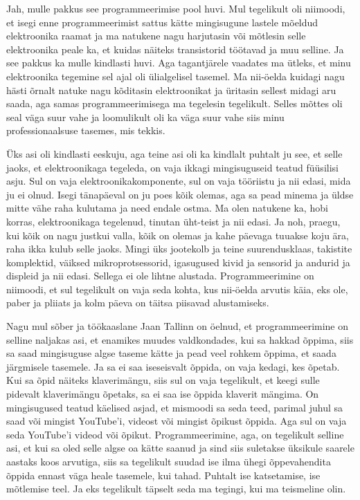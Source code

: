 
Jah, mulle pakkus see programmeerimise pool huvi. Mul tegelikult oli niimoodi, 
et isegi enne programmeerimist sattus kätte mingisugune lastele mõeldud 
elektroonika raamat ja ma  natukene nagu harjutasin või mõtlesin selle 
elektroonika peale ka, et kuidas näiteks transistorid töötavad ja muu selline. 
Ja see pakkus ka mulle kindlasti huvi. Aga tagantjärele vaadates  ma 
ütleks, et minu elektroonika tegemine sel ajal oli  ülialgelisel tasemel. Ma 
nii-öelda  kuidagi nagu hästi õrnalt natuke nagu kõditasin elektroonikat ja 
üritasin sellest midagi aru saada, aga samas programmeerimisega ma tegelesin  
tegelikult. Selles mõttes oli seal väga suur vahe ja loomulikult oli ka väga 
suur vahe siis minu  professionaalsuse tasemes, mis  tekkis.


Üks asi oli kindlasti eeskuju, aga teine asi oli ka kindlalt puhtalt ju see, et 
selle jaoks, et elektroonikaga tegeleda,  on vaja ikkagi mingisuguseid 
teatud füüsilisi asju. Sul on vaja elektroonikakomponente, sul on vaja 
tööriistu ja nii edasi, mida ju ei olnud. Isegi tänapäeval on ju poes  kõik 
olemas, aga sa pead minema ja üldse mitte vähe raha kulutama ja need 
endale ostma. Ma olen natukene ka, hobi korras, elektroonikaga tegelenud, 
tinutan üht-teist ja nii edasi. Ja noh, praegu, kui kõik on nagu 
justkui valla, kõik on olemas ja kahe päevaga tuuakse koju ära, raha ikka kulub 
selle jaoks. Mingi  üks jootekolb ja teine suurendusklaas, takistite 
komplektid, väiksed mikroprotsessorid, igasugused kivid ja sensorid ja andurid 
ja displeid ja nii edasi. Sellega ei ole lihtne alustada. Programmeerimine on 
niimoodi, et sul tegelikult on vaja seda kohta, kus nii-öelda arvutis käia, eks 
ole, paber ja pliiats ja kolm päeva on täitsa piisavad alustamiseks.

Nagu mul sõber ja töökaaslane Jaan Tallinn on  
öelnud, et programmeerimine on selline naljakas asi, et  enamikes muudes  
valdkondades, kui sa hakkad   õppima, siis sa saad mingisuguse 
algse  taseme kätte ja  pead veel rohkem õppima, et saada järgmisele 
tasemele. Ja sa ei saa iseseisvalt õppida,  
on vaja kedagi, kes õpetab. Kui sa õpid näiteks klaverimängu, siis sul on 
vaja tegelikult, et keegi sulle pidevalt klaverimängu õpetaks, sa ei saa 
ise õppida klaverit mängima. On mingisugused teatud käelised asjad, et 
mismoodi sa seda teed, parimal juhul sa saad või mingist YouTube'i, videost või 
mingist õpikust õppida. Aga sul on vaja seda YouTube'i videod või õpikut. 
Programmeerimine, aga, on tegelikult selline asi, et kui sa oled selle algse oa 
kätte saanud ja sind siis suletakse üksikule saarele aastaks koos arvutiga, siis sa tegelikult suudad ise ilma ühegi õppevahendita õppida 
ennast väga heale tasemele, kui tahad. Puhtalt ise katsetamise,  ise mõtlemise  
teel. Ja eks tegelikult täpselt seda ma tegingi, kui ma teismeline 
olin.

